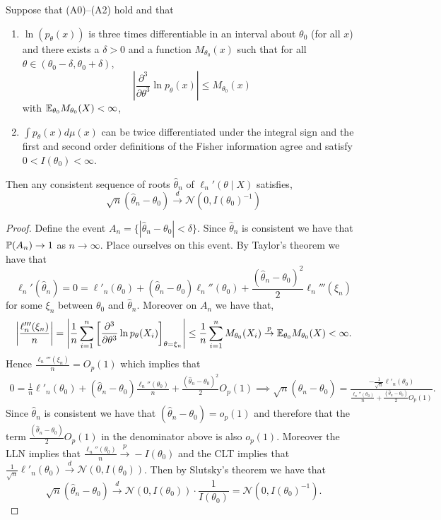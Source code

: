 \begin{theorem}
Suppose that (A0)--(A2) hold and that \begin{enumerate}
	\item[(A3)] $\ln(p_\theta(x))$ is three times differentiable in an interval about $\theta_0$ (for all $x$) and there exists a $\delta > 0$ and a function $M_{\theta_0}(x)$ such that for all $\theta \in (\theta_0 - \delta, \theta_0 + \delta)$, \[
		\left| \frac{\partial^3}{\partial \theta^3} \ln p_\theta(x) \right| \leq M_{\theta_0}(x)
	\] with $\mathbb{E}_{\theta_0} M_{\theta_0}(X) < \infty$,
	\item[(A4)$\phantom{'}$] $\int p_\theta(x) d\mu(x)$ can be twice differentiated under the integral sign and the first and second order definitions of the Fisher information agree and satisfy $0 < I(\theta_0) < \infty$.
\end{enumerate}
Then any consistent sequence of roots $\hat \theta_n$ of $\ell_n'(\theta \mid X)$  satisfies, \[
	\sqrt{n}(\hat \theta_n - \theta_0) \overset{d}{\to} \mathcal{N}(0, I(\theta_0)^{-1})
\]
\end{theorem}

\begin{proof}
	Define the event $A_n = \{ |\hat \theta_n - \theta_0| < \delta \}$. Since $\hat \theta_n$ is consistent we have that $\mathbb{P}(A_n) \to 1$ as $n \to \infty$. Place ourselves on this event. By Taylor's theorem we have that \[
		\ell_n'(\hat \theta_n) = 0 = \ell'_n(\theta_0) + (\hat \theta_n - \theta_0) \ell_n''(\theta_0) + \frac{(\hat \theta_n - \theta_0)^2}{2} \ell_n'''(\xi_n)
	\] for some $\xi_n$ between $\theta_0$ and $\hat \theta_n$. Moreover on $A_n$ we have that, \[
		\left| \frac{\ell_n'''(\xi_n)}{n}\right| = \left| \frac{1}{n} \sum_{i=1}^n \left[ \frac{\partial^3}{\partial \theta^3} \ln p_\theta(X_i) \right]_{\theta = \xi_n} \right| \leq \frac{1}{n} \sum_{i=1}^n M_{\theta_0}(X_i) \overset{p}{\to} \mathbb{E}_{\theta_0} M_{\theta_0}(X) < \infty.
	\] Hence $\frac{\ell_n'''(\xi_n)}{n} = O_p(1)$ which implies that \begin{align*}
		0 = \frac{1}{n}\ell'_n(\theta_0) + (\hat \theta_n - \theta_0) \frac{\ell_n''(\theta_0)}{n}  + \frac{(\hat \theta_n - \theta_0)^2}{2} O_p(1) \implies  
		\sqrt{n}(\hat \theta_n - \theta_0) = \frac{-\frac{1}{\sqrt{n}} \ell'_n(\theta_0)}{\frac{\ell_n''(\theta_0)}{n}  + \frac{(\hat \theta_n - \theta_0)}{2} O_p(1)}.
	\end{align*}
	Since $\hat \theta_n$ is consistent we have that $(\hat \theta_n - \theta_0) = o_p(1)$ and therefore that the term $\frac{(\hat \theta_n - \theta_0)}{2} O_p(1)$ in the denominator above is also $o_p(1)$. Moreover the LLN implies that $\frac{\ell_n''(\theta_0)}{n} \overset{p}{\to} -I(\theta_0)$ and the CLT implies that $\frac{1}{\sqrt{n}} \ell'_n(\theta_0) \overset{d}{\to} \mathcal N(0, I(\theta_0))$. Then by Slutsky's theorem we have that \[
		\sqrt{n}(\hat \theta_n - \theta_0) \overset{d}{\to} \mathcal{N}(0, I(\theta_0)) \cdot \frac{1}{I(\theta_0)} = \mathcal{N}(0, I(\theta_0)^{-1}).
	\] 
\end{proof}

